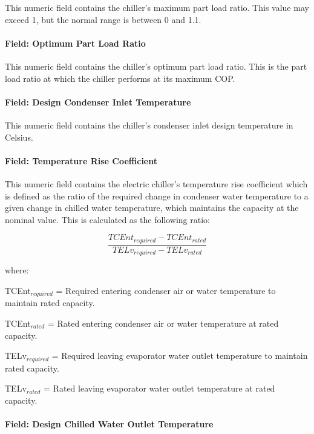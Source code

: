 This numeric field contains the chiller's maximum part load ratio. This value may exceed 1, but the normal range is between 0 and 1.1.

\paragraph{Field: Optimum Part Load Ratio}\label{field-optimum-part-load-ratio-5}

This numeric field contains the chiller's optimum part load ratio. This is the part load ratio at which the chiller performs at its maximum COP.

\paragraph{Field: Design Condenser Inlet Temperature}\label{field-design-condenser-inlet-temperature-3}

This numeric field contains the chiller's condenser inlet design temperature in Celsius.

\paragraph{Field: Temperature Rise Coefficient}\label{field-temperature-rise-coefficient-1}

This numeric field contains the electric chiller's temperature rise coefficient which is defined as the ratio of the required change in condenser water temperature to a given change in chilled water temperature, which maintains the capacity at the nominal value. This is calculated as the following ratio:

\begin{equation}
    \frac{{TCEn{t_{required}} - TCEn{t_{rated}}}}{{TEL{v_{required}} - TEL{v_{rated}}}}
\end{equation}

where:

TCEnt\(_{required}\) = Required entering condenser air or water temperature to maintain rated capacity.

TCEnt\(_{rated}\) = Rated entering condenser air or water temperature at rated capacity.

TELv\(_{required}\) = Required leaving evaporator water outlet temperature to maintain rated capacity.

TELv\(_{rated}\) = Rated leaving evaporator water outlet temperature at rated capacity.

\paragraph{Field: Design Chilled Water Outlet Temperature}\label{field-design-chilled-water-outlet-temperature-1}

